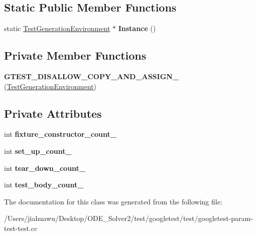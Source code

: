 \subsection*{Static Public Member Functions}
\begin{DoxyCompactItemize}
\item 
\mbox{\label{class_test_generation_environment_a5b8e14f430fe11d558c0e4482cebd694}} 
static \mbox{\hyperlink{class_test_generation_environment}{Test\+Generation\+Environment}} $\ast$ {\bfseries Instance} ()
\end{DoxyCompactItemize}
\subsection*{Private Member Functions}
\begin{DoxyCompactItemize}
\item 
\mbox{\label{class_test_generation_environment_a995321b3007e0b271b14b238dd3cb9bd}} 
{\bfseries G\+T\+E\+S\+T\+\_\+\+D\+I\+S\+A\+L\+L\+O\+W\+\_\+\+C\+O\+P\+Y\+\_\+\+A\+N\+D\+\_\+\+A\+S\+S\+I\+G\+N\+\_\+} (\mbox{\hyperlink{class_test_generation_environment}{Test\+Generation\+Environment}})
\end{DoxyCompactItemize}
\subsection*{Private Attributes}
\begin{DoxyCompactItemize}
\item 
\mbox{\label{class_test_generation_environment_a106c1554fde078d47a535694a2c700e7}} 
int {\bfseries fixture\+\_\+constructor\+\_\+count\+\_\+}
\item 
\mbox{\label{class_test_generation_environment_a026dbcdb993a8510dbfea85ad71eab8a}} 
int {\bfseries set\+\_\+up\+\_\+count\+\_\+}
\item 
\mbox{\label{class_test_generation_environment_a2b3d02a53e98a72516430d98fd8931ef}} 
int {\bfseries tear\+\_\+down\+\_\+count\+\_\+}
\item 
\mbox{\label{class_test_generation_environment_a7d1ce26e381894b72d2ca7f4630914fa}} 
int {\bfseries test\+\_\+body\+\_\+count\+\_\+}
\end{DoxyCompactItemize}


The documentation for this class was generated from the following file\+:\begin{DoxyCompactItemize}
\item 
/\+Users/jiahuawu/\+Desktop/\+O\+D\+E\+\_\+\+Solver2/test/googletest/test/googletest-\/param-\/test-\/test.\+cc\end{DoxyCompactItemize}
